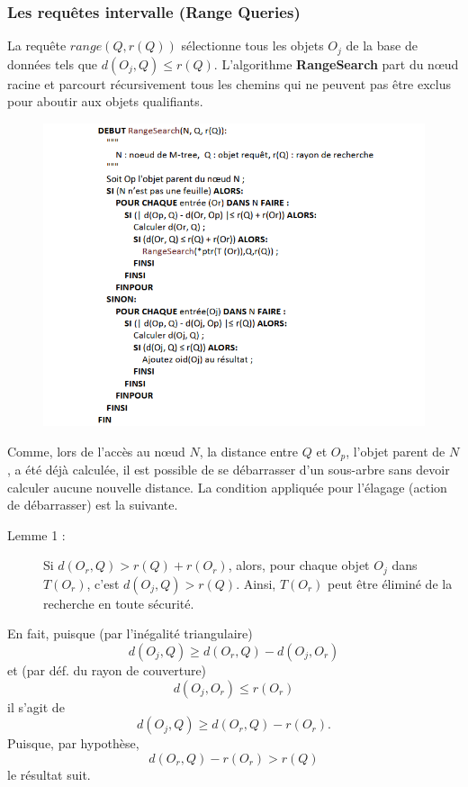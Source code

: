 \subsubsection{Les requêtes intervalle (Range Queries)}
La requête $ range(Q, r(Q)) $ sélectionne tous les objets $ O_j $ de la base de données tels que $ d(O_j, Q) \le r(Q) $. L'algorithme \textbf{RangeSearch} part du nœud racine et parcourt récursivement tous les chemins qui ne peuvent pas être exclus pour aboutir aux objets qualifiants.
\begin{figure}[H]
	\centering
	\includegraphics[width=.9 \textwidth]{Figures/rangesearxh.png} %
\end{figure} 

Comme, lors de l'accès au nœud $ N $, la distance entre $ Q $ et $ O_p $, l'objet parent de $ N $, a été déjà calculée, il est possible de se débarrasser d'un sous-arbre sans devoir calculer aucune nouvelle distance. La condition appliquée pour l'élagage (action de débarrasser) est la suivante.
\begin{description}
	\item[Lemme 1 :] Si $ d(O_r, Q) > r(Q) + r(O_r) $, alors, pour chaque objet $ O_j  $ dans $ T (O_r) $, c'est $ d(O_j, Q) > r(Q) $. Ainsi, $ T (O_r) $ peut être éliminé de la recherche en toute sécurité.
\end{description}
En fait, puisque (par l'inégalité triangulaire)
\begin{displaymath}
    d(O_j, Q) \ge d(O_r, Q) - d(O_j, O_r) 
\end{displaymath}  
et (par déf. du rayon de couverture)
\begin{displaymath}
	d(O_j, O_r) \le r(O_r)
\end{displaymath}
il s'agit de 
\begin{displaymath}
	 d(O_j, Q) \ge d(O_r, Q)-r(O_r).
\end{displaymath} 
Puisque, par hypothèse,  
\begin{displaymath}
	 d(O_r, Q) - r(O_r) > r(Q)
\end{displaymath}
le résultat suit.\\
 
